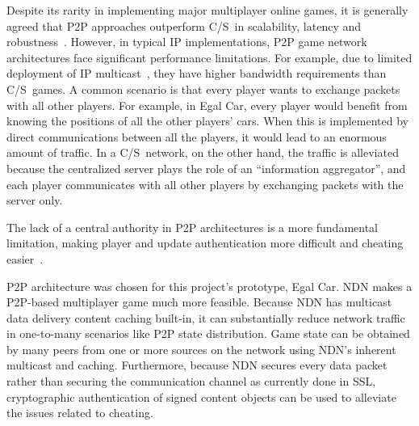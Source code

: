 \documentclass{article}
\newcommand{\cs}{C\slash S}
\begin{document}
Despite its rarity in implementing major multiplayer online games, it is generally agreed that P2P approaches outperform \cs~in scalability, latency and robustness~\cite{Fgame, Scheating}. However, in typical IP implementations, P2P game network architectures face significant performance limitations. For example, due to limited deployment of IP multicast~\cite{Fgame}, they have higher bandwidth requirements than \cs~games. A common scenario is that every player wants to exchange packets with all other players. For example, in Egal Car, every player would benefit from knowing the positions of all the other players' cars. When this is implemented by direct communications between all the players, it would lead to an enormous amount of traffic. In a \cs~network, on the other hand, the traffic is alleviated because the centralized server plays the role of an ``information aggregator'', and each player communicates with all other players by exchanging packets with the server only. 

The lack of a central authority in P2P architectures is a more fundamental limitation, making player and update authentication more difficult and cheating easier~\cite{Scheating}. 

P2P architecture was chosen for this project's prototype, Egal Car. 
NDN makes a P2P-based multiplayer game much more feasible. Because NDN has multicast data delivery content caching built-in, it can substantially reduce network traffic in one-to-many scenarios like P2P state distribution.  
Game state can be obtained by many peers from one or more sources on the network using NDN's inherent multicast and caching. 
Furthermore, because NDN secures every data packet rather than securing the communication channel as currently done in SSL, cryptographic authentication of signed content objects can be used to alleviate the issues related to cheating.  
\end{document}
